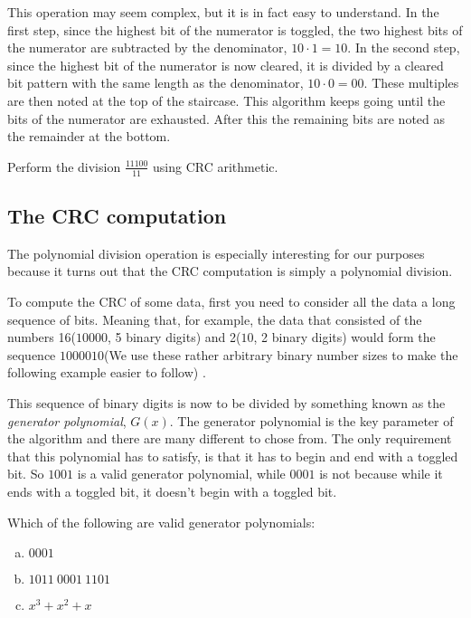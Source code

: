 This operation may seem complex, but it is in fact easy to
understand. In the first step, since the highest bit of the numerator
is toggled, the two highest bits of the numerator are subtracted by
the denominator, $10 \cdot 1 = 10$. In the second step, since the
highest bit of the numerator is now cleared, it is divided by a
cleared bit pattern with the same length as the denominator, $10 \cdot
0 = 00$. These multiples are then noted at the top of the
staircase. This algorithm keeps going until the bits of the numerator
are exhausted. After this the remaining bits are noted as the
remainder at the bottom.

\begin{Exercise}[label={poly-div}]
  Perform the division $\frac{11100}{11}$ using CRC arithmetic.
\end{Exercise}

\subsection{The CRC computation}

The polynomial division operation is especially interesting for our
purposes because it turns out that the CRC computation is simply a
polynomial division.

To compute the CRC of some data, first you need to consider all the
data a long sequence of bits. Meaning that, for example, the data that
consisted of the numbers 16($10000$, 5 binary digits) and 2($10$, 2
binary digits) would form the sequence $1000010$(We use these rather
arbitrary binary number sizes to make the following example easier to
follow) .

This sequence of binary digits is now to be divided by something known
as the \textit{generator polynomial}, $G(x)$. The generator polynomial
is the key parameter of the algorithm and there are many different to
chose from. The only requirement that this polynomial has to satisfy,
is that it has to begin and end with a toggled bit. So $1001$ is a valid
generator polynomial, while $0001$ is not because while it ends with a
toggled bit, it doesn't begin with a toggled bit.

\begin{Exercise}[label={valid-gen}]

  Which of the following are valid generator polynomials:

  \begin{enumerate}[(a)]
  \item $0001$
  \item $1011\ 0001\ 1101$
  \item $x^3 + x^2 + x$
  \end{enumerate}

\end{Exercise}

